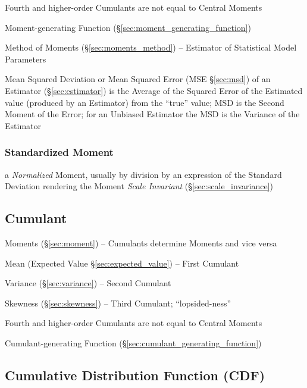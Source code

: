 Fourth and higher-order Cumulants are not equal to Central Moments

\fist Moment-generating Function (\S\ref{sec:moment_generating_function})

\fist Method of Moments (\S\ref{sec:moments_method}) -- Estimator of Statistical
Model Parameters

\fist Mean Squared Deviation or Mean Squared Error (MSE \S\ref{sec:msd}) of an
Estimator (\S\ref{sec:estimator}) is the Average of the Squared Error of the
Estimated value (produced by an Estimator) from the ``true'' value; MSD is
the Second Moment of the Error; for an Unbiased Estimator the MSD is the
Variance of the Estimator



\subsubsection{Standardized Moment}\label{sec:standardized_moment}

a \emph{Normalized} Moment, usually by division by an expression of the Standard
Deviation rendering the Moment \emph{Scale Invariant}
(\S\ref{sec:scale_invariance})



\subsection{Cumulant}\label{sec:cumulant}

\fist Moments (\S\ref{sec:moment}) -- Cumulants determine Moments and vice
versa

Mean (Expected Value \S\ref{sec:expected_value}) -- First Cumulant

Variance (\S\ref{sec:variance}) -- Second Cumulant

Skewness (\S\ref{sec:skewness}) -- Third Cumulant; ``lopsided-ness''

Fourth and higher-order Cumulants are not equal to Central Moments

\fist Cumulant-generating Function (\S\ref{sec:cumulant_generating_function})



\subsection{Cumulative Distribution Function (CDF)}\label{sec:cdf}

